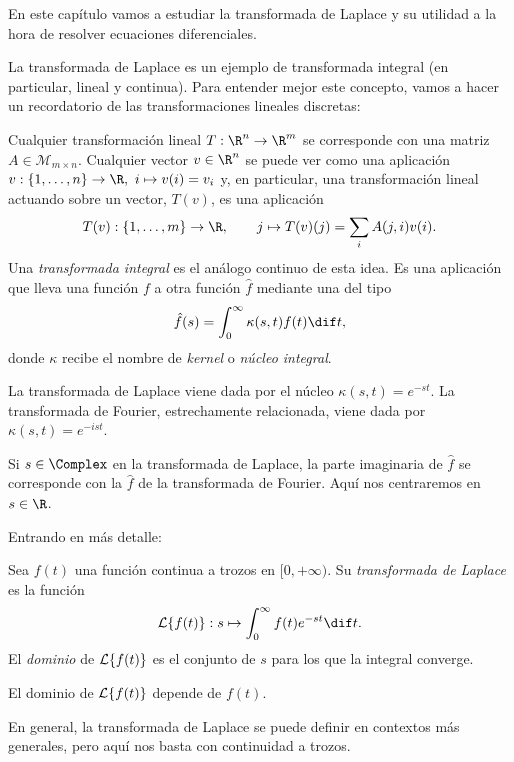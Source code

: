 \documentclass[../ecuaciones_diferenciales.tex]{subfiles}
\begin{document}
En este capítulo vamos a estudiar la transformada de Laplace y su utilidad a la
hora de resolver ecuaciones diferenciales.

La transformada de Laplace es un ejemplo de transformada integral (en
particular, lineal y continua). Para entender mejor este concepto, vamos a
hacer un recordatorio de las transformaciones lineales discretas:

Cualquier transformación lineal \(T : \R^n \to \R^m\) se corresponde con una
matriz \(A \in \mathcal{M}_{m \times n}\). Cualquier vector \(v \in \R^n\) se
puede ver como una aplicación
\(v : \{1, \dots, n\} \to \R,\ i \mapsto v(i) = v_i\) y, en particular, una
transformación lineal actuando sobre un vector, \(T(v)\), es una aplicación
\[T(v) : \{1, \dots, m\} \to \R, \qquad j \mapsto T(v)(j) = \sum_i A(j,i)v(i).\]
Una \emph{transformada integral} es el análogo continuo de esta idea. Es una
aplicación que lleva una función \(f\) a otra función \(\hat{f}\) mediante una
 del tipo
\[\hat{f}(s) = \int_0^\infty \kappa(s,t) f(t) \dif t,\]
donde \(\kappa\) recibe el nombre de \emph{kernel} o \emph{núcleo integral}.

La transformada de Laplace viene dada por el núcleo \(\kappa(s,t) =
e^{-st}\). La transformada de Fourier, estrechamente relacionada, viene dada por
\(\kappa(s,t) = e^{-ist}\).

\begin{remark}
	Si \(s \in \Complex\) en la transformada de Laplace, la parte imaginaria de
	\(\hat{f}\) se corresponde con la \(\hat{f}\) de la transformada de
	Fourier. Aquí nos centraremos en \(s \in \R\).
\end{remark}

Entrando en más detalle:

\begin{definition}
	Sea \(f(t)\) una función continua a trozos en \([0,+\infty)\). Su
	\emph{transformada de Laplace} es la función
	\[\L\{f(t)\} : s \mapsto \int_0^\infty f(t)e^{-st} \dif t.\]
	El \emph{dominio} de \(\mathcal{L}\{f(t)\}\) es el conjunto de \(s\) para los que la
	integral converge.
\end{definition}

\begin{remark}
	El dominio de \(\mathcal{L}\{f(t)\}\) depende de \(f(t)\).
\end{remark}

\begin{remark}
	En general, la transformada de Laplace se puede definir en contextos más
	generales, pero aquí nos basta con continuidad a trozos.
\end{remark}
\end{document}
